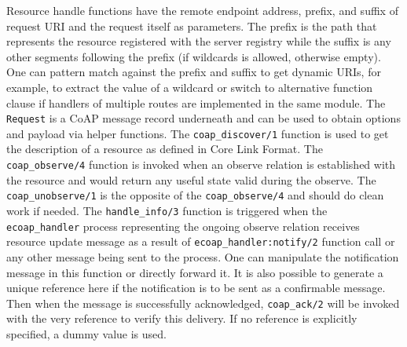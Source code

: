 
Resource handle functions have the remote endpoint address, prefix, and suffix of request URI and the request itself as parameters. The prefix is the path that represents the resource registered with the server registry while the suffix is any other segments following the prefix (if wildcards is allowed, otherwise empty). One can pattern match against the prefix and suffix to get dynamic URIs, for example, to extract the value of a wildcard or switch to alternative function clause if handlers of multiple routes are implemented in the same module. The \verb|Request| is a CoAP message record underneath and can be used to obtain options and payload via helper functions. The \verb|coap_discover/1| function is used to get the description of a resource as defined in Core Link Format. The \verb|coap_observe/4| function is invoked when an observe relation is established with the resource and would return any useful state valid during the observe. The \verb|coap_unobserve/1| is the opposite of the \verb|coap_observe/4| and should do clean work if needed. The \verb|handle_info/3| function is triggered when the \verb|ecoap_handler| process representing the ongoing observe relation receives resource update message as a result of \verb|ecoap_handler:notify/2| function call or any other message being sent to the process. One can manipulate the notification message in this function or directly forward it. It is also possible to generate a unique reference here if the notification is to be sent as a confirmable message. Then when the message is successfully acknowledged, \verb|coap_ack/2| will be invoked with the very reference to verify this delivery. If no reference is explicitly specified, a dummy value is used. 

